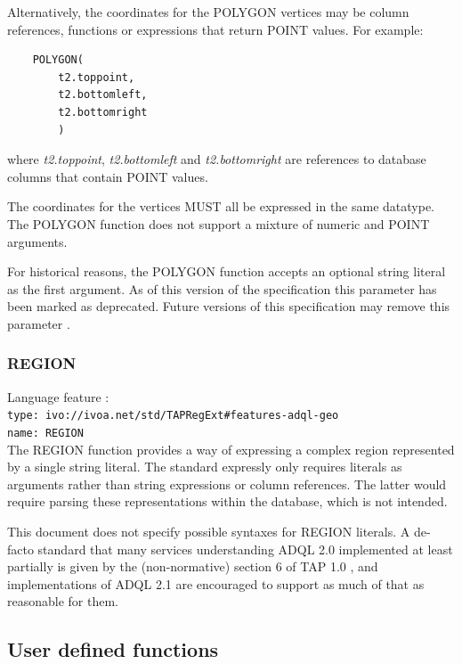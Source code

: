 \documentclass[11pt,a4paper]{ivoa}
\begin{document}
Alternatively, the coordinates for the POLYGON vertices may be column references,
functions or expressions that return POINT values.
For example:
\begin{verbatim}
    POLYGON(
        t2.toppoint,
        t2.bottomleft,
        t2.bottomright
        )
\end{verbatim}
\noindent
where \textit{t2.toppoint}, \textit{t2.bottomleft} and \textit{t2.bottomright}
are references to database columns that contain POINT values.

The coordinates for the vertices MUST all be expressed in the same datatype.
The POLYGON function does not support a mixture of numeric and POINT
arguments.

For historical reasons, the POLYGON function accepts an optional string literal
as the first argument.
As of this version of the specification this parameter has been
marked as deprecated.
Future versions of this specification may remove this parameter
.

\subsubsection{REGION}
\label{sec:functions.geom.region}

{\footnotesize Language feature :}\\
{\footnotesize \verb|type: ivo://ivoa.net/std/TAPRegExt#features-adql-geo|}\\
{\footnotesize \verb|name: REGION|}\\


The REGION function provides a way of expressing a complex region
represented by a single string literal.  The standard expressly only
requires literals as arguments rather than string expressions or column
references.  The latter would require parsing these representations
within the database, which is not intended.

This document does not specify possible syntaxes for REGION
literals.  A de-facto standard that many services understanding ADQL 2.0
implemented at least partially is given by the (non-normative) section 6
of TAP 1.0 \citep{2010ivoa.spec.0327D}, and implementations of ADQL 2.1 are
encouraged to support as much of that as reasonable for them.

\subsection{User defined functions}
\label{sec:user.functions}
\end{document}
